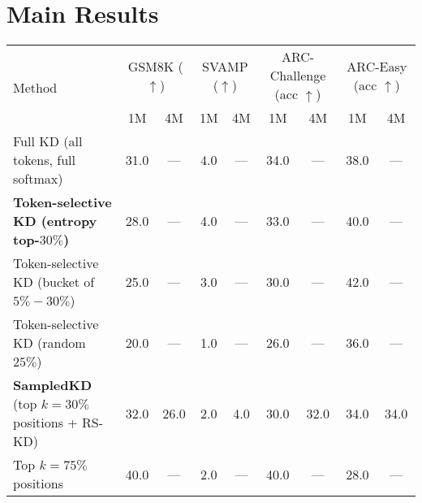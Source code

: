 \documentclass[11pt]{article}
\begin{document}
\section{Main Results}
\label{sec:main-results}
\begin{table*}[t]
	\centering
	\small
	\setlength{\tabcolsep}{6pt}
	\begin{tabular}{lcccccccc}
		\toprule
		\multirow{2}{*}{Method}
		                                                    & \multicolumn{2}{c}{GSM8K ($\uparrow$)}
		                                                    & \multicolumn{2}{c}{SVAMP ($\uparrow$)}
		                                                    & \multicolumn{2}{c}{ARC-Challenge (acc $\uparrow$)}
		                                                    & \multicolumn{2}{c}{ARC-Easy (acc $\uparrow$)}              \\
		\cmidrule(lr){2-3}\cmidrule(lr){4-5}\cmidrule(lr){6-7}\cmidrule(lr){8-9}
		                                                    & 1M                                                 & 4M                      & 1M                       & 4M                       & 1M   & 4M   & 1M   & 4M   \\
		\midrule
		Full KD (all tokens, full softmax)                  & 31.0                                               & ---                     & 4.0                      & ---                      & 34.0 & ---  & 38.0 & ---  \\
		\textbf{Token-selective KD (entropy top-$30\%$)}    & 28.0                                               & ---                     & 4.0                      & ---                      & 33.0 & ---  & 40.0 & ---  \\
		Token-selective KD (bucket of $5\%-30\%$)           & 25.0                                               & ---                     & 3.0                      & ---                      & 30.0 & ---  & 42.0 & ---  \\
		Token-selective KD (random $25\%$)                  & 20.0                                               & ---                     & 1.0                      & ---                      & 26.0 & ---  & 36.0 & ---  \\
		\addlinespace[2pt]
		\textbf{SampledKD} (top $k=30\%$ positions + RS-KD) & 32.0                                               & 26.0                    & 2.0                      & 4.0                      & 30.0 & 32.0 & 34.0 & 34.0 \\
		\quad Top $k=75\%$ positions                        & 40.0                                               & ---                     & 2.0                      & ---                      & 40.0 & ---  & 28.0 & ---  \\

\end{tabular}
\end{table*}
\end{document}
